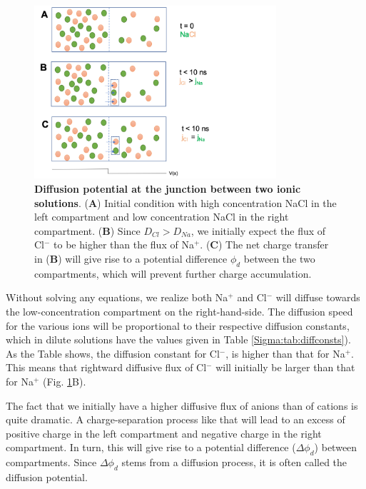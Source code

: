 \begin{figure}[!ht]
\begin{center}
\includegraphics[width=0.8\textwidth]{Figures/Eldiff/Diffusionpot.png}
\end{center}
\caption{\textbf{Diffusion potential at the junction between two ionic solutions}. ({\bf A}) Initial condition with high concentration NaCl in the left compartment and low concentration NaCl in the right compartment. ({\bf B}) Since $D_{Cl} > D_{Na}$, we initially expect the flux of Cl$^-$ to be higher than the flux of Na$^+$. ({\bf C}) The net charge transfer in ({\bf B}) will give rise to a potential difference $\phi_d$ between the two compartments, which will prevent further charge accumulation. }
\label{Eldiff:fig:diffpot}
\end{figure}

Without solving any equations, we realize both Na$^+$ and Cl$^-$ will diffuse towards the low-concentration compartment on the right-hand-side. The diffusion speed for the various ions will be proportional to their respective diffusion constants, which in dilute solutions have the values given in Table \ref{Sigma:tab:diffconsts}). As the Table shows, the diffusion constant for Cl$^-$, is higher than that for Na$^+$. This means that rightward diffusive flux of Cl$^-$ will initially be larger than that for Na$^+$  (Fig. \ref{Eldiff:fig:diffpot}B). 

The fact that we initially have a higher diffusive flux of anions than of cations is quite dramatic. A charge-separation process like that will lead to an excess of positive charge in the left compartment and negative charge in the right compartment. In turn, this will give rise to a potential difference ($\Delta \phi_d$) between compartments. Since $\Delta \phi_d$ stems from a diffusion process, it is often called the diffusion potential. 

